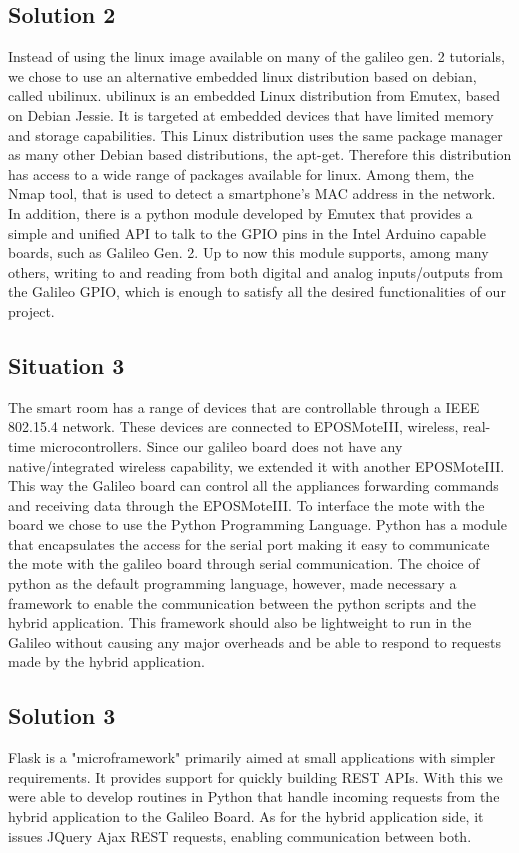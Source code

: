 \documentclass[12pt]{partialreport}
\begin{document}
\subsection*{Solution 2}
Instead of using the linux image available on many of the galileo gen. 2 tutorials, we chose to use an alternative embedded linux distribution based on debian, called ubilinux. ubilinux is an embedded Linux distribution from Emutex, based on Debian Jessie. It is targeted at embedded devices that have limited memory and storage capabilities. This Linux distribution uses the same package manager as many other Debian based distributions, the apt-get. Therefore this distribution has access to a wide range of packages available for linux. Among them, the Nmap tool, that is used to detect a smartphone's MAC address in the network.
In addition, there is a python module developed by Emutex that provides a simple and unified API to talk to the GPIO pins in the Intel Arduino capable boards, such as Galileo Gen. 2. Up to now this module supports, among many others, writing to and reading from both digital and analog inputs/outputs from the Galileo GPIO, which is enough to satisfy all the desired functionalities of our project.

\subsection*{Situation 3}
The smart room has a range of devices that are controllable through a IEEE 802.15.4 network. These devices are connected to EPOSMoteIII, wireless, real-time microcontrollers. Since our galileo board does not have any native/integrated wireless capability, we extended it with another EPOSMoteIII. This way the Galileo board can control all the appliances forwarding commands and receiving data through the EPOSMoteIII. To interface the mote with the board we chose to use the Python Programming Language. Python has a module that encapsulates the access for the serial port making it easy to communicate the mote with the galileo board through serial communication. The choice of python as the default programming language, however, made necessary a framework to enable the communication between the python scripts and the hybrid application. This framework should also be lightweight to run in the Galileo without causing any major overheads and be able to respond to requests made by the hybrid application.

\subsection*{Solution 3}
Flask is a "microframework" primarily aimed at small applications with simpler requirements. It provides support for quickly building REST APIs. With this we were able to develop routines in Python that handle incoming requests from the hybrid application to the Galileo Board. As for the hybrid application side, it issues JQuery Ajax REST requests, enabling communication between both.
\end{document}
